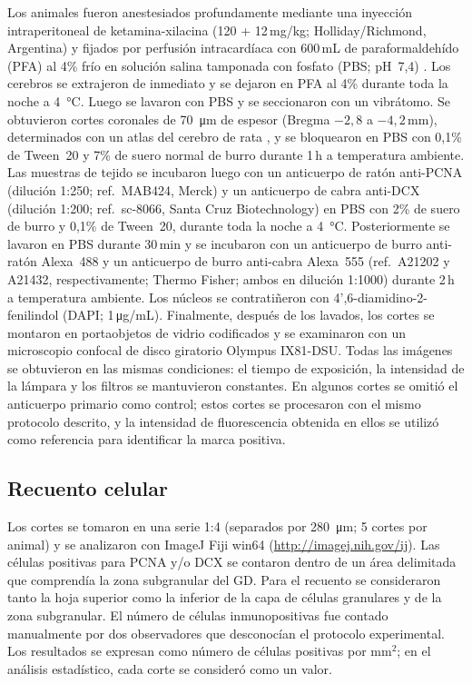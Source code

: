 Los animales fueron anestesiados profundamente mediante una inyección intraperitoneal de ketamina-xilacina (120 + 12\,mg/kg; Holliday/Richmond, Argentina) y fijados por perfusión intracardíaca con 600\,mL de paraformaldehído (PFA) al 4\% frío en solución salina tamponada con fosfato (PBS; pH~7,4) \cite{kruse2012lxr}. Los cerebros se extrajeron de inmediato y se dejaron en PFA al 4\% durante toda la noche a \SI{4}{\celsius}. Luego se lavaron con PBS y se seccionaron con un vibrátomo. Se obtuvieron cortes coronales de \SI{70}{\micro\metre} de espesor (Bregma $-2{,}8$ a $-4{,}2$\,mm), determinados con un atlas del cerebro de rata \cite{paxinos1986rat}, y se bloquearon en PBS con 0,1\% de Tween~20 y 7\% de suero normal de burro durante 1\,h a temperatura ambiente. Las muestras de tejido se incubaron luego con un anticuerpo de ratón anti-PCNA (dilución 1:250; ref.\ MAB424, Merck) y un anticuerpo de cabra anti-DCX (dilución 1:200; ref.\ sc-8066, Santa Cruz Biotechnology) en PBS con 2\% de suero de burro y 0,1\% de Tween~20, durante toda la noche a \SI{4}{\celsius}. Posteriormente se lavaron en PBS durante 30\,min y se incubaron con un anticuerpo de burro anti-ratón Alexa~488 y un anticuerpo de burro anti-cabra Alexa~555 (ref.\ A21202 y A21432, respectivamente; Thermo Fisher; ambos en dilución 1:1000) durante 2\,h a temperatura ambiente. Los núcleos se contratiñeron con 4',6-diamidino-2-fenilindol (DAPI; 1\,\si{\micro\gram}/mL). Finalmente, después de los lavados, los cortes se montaron en portaobjetos de vidrio codificados y se examinaron con un microscopio confocal de disco giratorio Olympus IX81-DSU. Todas las imágenes se obtuvieron en las mismas condiciones: el tiempo de exposición, la intensidad de la lámpara y los filtros se mantuvieron constantes. En algunos cortes se omitió el anticuerpo primario como control; estos cortes se procesaron con el mismo protocolo descrito, y la intensidad de fluorescencia obtenida en ellos se utilizó como referencia para identificar la marca positiva.

\FloatBarrier
\subsection{Recuento celular}\label{sec:recuento}

Los cortes se tomaron en una serie 1:4 (separados por \SI{280}{\micro\metre}; 5 cortes por animal) y se analizaron con ImageJ Fiji win64 (\url{http://imagej.nih.gov/ij}). Las células positivas para PCNA y/o DCX se contaron dentro de un área delimitada que comprendía la zona subgranular del GD. Para el recuento se consideraron tanto la hoja superior como la inferior de la capa de células granulares y de la zona subgranular. El número de células inmunopositivas fue contado manualmente por dos observadores que desconocían el protocolo experimental. Los resultados se expresan como número de células positivas por mm$^2$; en el análisis estadístico, cada corte se consideró como un valor.

